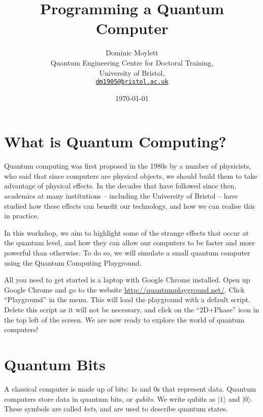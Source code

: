 \documentclass[twocolumn]{article}
\begin{document}
\lstset{style=Style1}

\title{Programming a Quantum Computer} 
\author{Dominic Moylett\\
        	Quantum Engineering Centre for Doctoral Training,\\
		University of Bristol,\\
		\texttt{\href{mailto:dm1905@bristol.ac.uk}{dm1905@bristol.ac.uk}} 
		}
\date{\today} 
\maketitle

\section{What is Quantum Computing?}

Quantum computing was first proposed in the 1980s by a number of physicists, who said that since computers are physical objects, we should build them to take advantage of physical effects. In the decades that have followed since then, academics at many institutions -- including the University of Bristol -- have studied how these effects can benefit our technology, and how we can realise this in practice.

In this workshop, we aim to highlight some of the strange effects that occur at the quantum level, and how they can allow our computers to be faster and more powerful than otherwise. To do so, we will simulate a small quantum computer using the Quantum Computing Playground.

All you need to get started is a laptop with Google Chrome installed. Open up Google Chrome and go to the website \url{http://quantumplayground.net/}. Click ``Playground'' in the menu. This will load the playground with a default script. Delete this script as it will not be necessary, and click on the ``2D+Phase'' icon in the top left of the screen. We are now ready to explore the world of quantum computers!

\section{Quantum Bits}

A classical computer is made up of bits: $1$s and $0$s that represent data. Quantum computers store data in quantum bits, or {\em qubits}. We write qubits as $|1\rangle$ and $|0\rangle$. These symbols are called {\em kets}, and are used to describe quantum states.
\end{document}
